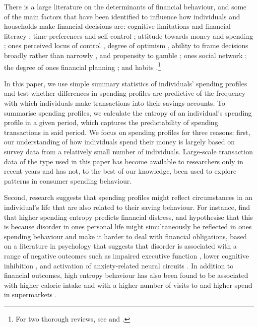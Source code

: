 There is a large literature on the determinants of financial behaviour, and
some of the main factors that have been identified to influence how
individuals and households make financial decisions are: cognitive limitations
and financial literacy \citep{agarwal2009age, agarwal2013cognitive,
    korniotis2011older, agarwal2010learning, fernandes2014financial,
    jorring2020financial}; time-preferences and self-control
    \citep{frederick2002time, read2018intertemporal, ericson2019intertemporal,
    cohen2020measuring}; attitude towards money and spending
    \citep{rick2008tightwads, rick2011fatal}; ones perceived locus of control
    \citep{perry2005control}, degree of optimism \citep{puri2007optimism},
    ability to frame decisions broadly rather than narrowly
    \citep{kumar2008decision}, and propensity to gamble
    \citep{kumar2009gambles}; ones social network \citep{bailey2018economic,
        kuchler2021social}; the degree of ones financial planning
        \citep{ameriks2003wealth}; and habits \citep{blumenstock2018defaults,
            schaner2018persistent, de2013deposit}.\footnote{For two thorough
        reviews, see \citet{agarwal2017shapes} and
    \citet{greenberg2019financial}.}

In this paper, we use simple summary statistics of individuals' spending
profiles and test whether differences in spending profiles are predictive of
the frequency with which individuals make transactions into their savings
accounts. To summarise spending profiles, we calculate the entropy of an
individual's spending profile in a given period, which captures the
predictability of spending transactions in said period. We focus on spending
profiles for three reasons: first, our understanding of how individuals spend
their money is largely based on survey data from a relatively small number of
individuals. Large-scale transaction data of the type used in this paper has
become available to researchers only in recent years and has not, to the best
of our knowledge, been used to explore patterns in consumer spending behaviour. 

Second, research suggests that spending profiles might reflect circumstances in
an individual's life that are also related to their saving behaviour. For
instance, \citet{muggleton2020evidence} find that higher spending entropy
predicts financial distress, and hypothesise that this is because disorder in
ones personal life might simultaneously be reflected in ones spending behaviour
and make it harder to deal with financial obligations, based on a literature in
psychology that suggests that disorder is associated with a range of negative
outcomes such as impaired executive function \citep{vernon2016predictors},
lower cognitive inhibition \citep{mittal2015cognitive}, and activation of
anxiety-related neural circuits \citep{hirsh2012psychological}. In addition to
financial outcomes, high entropy behaviour has also been found to be associated
with higher calorie intake \citep{skatova2019those} and with a higher number of
visits to and higher spend in supermarkets \citep{guidotti2015behavioral}.

